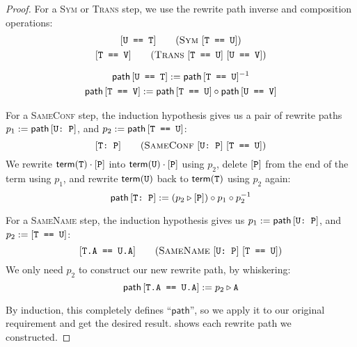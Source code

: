 \documentclass[../generics]{subfiles}
\begin{document}
\begin{proof}
For a \textsc{Sym} or \textsc{Trans} step, we use the rewrite path inverse and composition operations:
\begin{gather*}
\SymStepDef\\
\TransStepDef\\[\medskipamount]
\Path\SameReq{U}{T} := \Path\TU^{-1}\\
\Path\SameReq{T}{V} := \Path\TU \circ \Path\SameReq{U}{V}
\end{gather*}

For a \textsc{SameConf} step, the induction hypothesis gives us a pair of rewrite paths $p_1 := \mathsf{path}\, [\texttt{U:~P}]$, and $p_2 := \mathsf{path}\, [\texttt{T == U}]$:
\[\SameConfStepDef\]
We rewrite $\mathsf{term}(\texttt{T})\cdot[\texttt{P}]$ into $\mathsf{term}(\texttt{U})\cdot[\texttt{P}]$ using $p_2$, delete $[\texttt{P}]$ from the end of the term using $p_1$, and rewrite $\mathsf{term}(\texttt{U})$ back to $\mathsf{term}(\texttt{T})$ using $p_2$ again:
\[
\mathsf{path}\, [\texttt{T:~P}] := (p_2 \triangleright [\texttt{P}]) \circ p_1 \circ p_2^{-1}
\]

For a \textsc{SameName} step, the induction hypothesis gives us $p_1 := \mathsf{path}\, [\texttt{U:~P}]$, and $p_2 := [\texttt{T == U}]$:
\[\SameNameStepDef\]
We only need $p_2$ to construct our new rewrite path, by whiskering:
\[
\mathsf{path}\,[\texttt{T.A == U.A}] := p_2 \triangleright \texttt{A}
\]

By induction, this completely defines ``$\mathsf{path}$'', so we apply it to our original requirement and get the desired result.  shows each rewrite path we constructed.
\end{proof}
\end{document}
